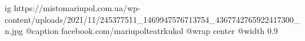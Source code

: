  
 
 
 
 

\ifcmt
  ig https://mistomariupol.com.ua/wp-content/uploads/2021/11/245377511_1469947576713754_4367742765922417300_n.jpg
	@caption facebook.com/mariupolteatrkukol
  @wrap center
  @width 0.9
\fi
